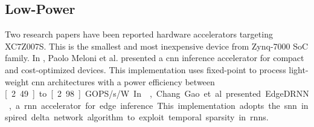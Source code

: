 \subsection{Low-Power}
Two research papers have been reported hardware accelerators targeting XC7Z007S. This is the smallest and most inexpensive device from Zynq-7000 SoC family. In \cite{meloni2019cnn}, Paolo Meloni et al. presented a \gls{cnn} inference accelerator for compact and cost-optimized devices. This implementation uses fixed-point to process light-weight \gls{cnn} architectures with a power efficiency between \unit[2.49] to \unit[2.98]{GOPS/s/W}. In \cite{gao2020edgedrnn}, Chang Gao et al. presented EdgeDRNN, a \gls{rnn} accelerator for edge inference. This implementation adopts the \gls{snn} inspired delta network algorithm to exploit temporal sparsity in \glspl{rnn}.